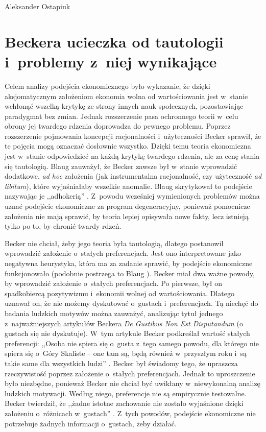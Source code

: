 \begin{artplenv}{Aleksander Ostapiuk}
\section{Beckera ucieczka od tautologii i~problemy z~niej wynikające}
Celem analizy podejścia ekonomicznego było wykazanie, że dzięki aksjomatycznym założeniom ekonomia wolna od wartościowania
jest w~stanie wchłonąć wszelką krytykę ze strony innych nauk społecznych, pozostawiając paradygmat bez zmian. Jednak
rozszerzenie pasa ochronnego teorii w~celu obrony jej twardego rdzenia doprowadza do pewnego problemu.
Poprzez rozszerzenie pojmowania koncepcji racjonalności i~użyteczności Becker sprawił, że te pojęcia mogą oznaczać
dosłownie wszystko. Dzięki temu teoria ekonomiczna jest w~stanie odpowiedzieć na każdą krytykę twardego rdzenia, ale za
cenę stania się tautologią. Blaug zauważył, że Becker zawsze był w~stanie wprowadzić dodatkowe, \textit{ad hoc}
założenia (jak instrumentalna racjonalność, czy użyteczność \textit{ad libitum}), które wyjaśniałaby wszelkie
anomalie. Blaug skrytykował to podejście nazywając je ,,adhokerią''
\parencite[s.~325–326]{blaug_metodologia_1995}.
Z~powodu wcześniej wymienionych problemów można uznać podejście ekonomiczne za program degeneracyjny, ponieważ pomocnicze
założenia nie mają sprawić, by teoria lepiej opisywała nowe fakty, lecz istnieją tylko po to, by chronić twardy rdzeń. 

Becker nie chciał, żeby jego teoria była tautologią, dlatego postanowił wprowadzić założenie o~stałych preferencjach.
Jest ono interpretowane jako negatywna heurystyka, która ma za zadanie sprawić, by podejście ekonomiczne funkcjonowało
(podobnie postrzega to Blaug \parencite*[s.~323–324]{blaug_metodologia_1995}).
Becker miał dwa ważne powody, by
wprowadzić założenie o~stałych preferencjach. Po pierwsze, był on spadkobiercą pozytywizmu i~ekonomii wolnej od
wartościowania. Dlatego uznawał on, że nie możemy dyskutować o~gustach i~preferencjach. Tą niechęć do badania ludzkich
motywów można zauważyć, analizując tytuł jednego z~najważniejszych artykułów Beckera \textit{De Gustibus Non Est
Disputandum} (o gustach się nie dyskutuje). W~tym artykule Becker podkreślał wartość stałych preferencji: ,,Osoba nie
spiera się o~gusta z~tego samego powodu, dla którego nie spiera się o~Góry Skaliste -- one tam są, będą
również w~przyszłym roku i~są takie same dla wszystkich ludzi''
\parencite[s.~76]{becker_gustibus_1977}.
Becker
był świadomy tego, że upraszcza rzeczywistość poprzez założenie o~stałych preferencjach. Jednak to uproszczenie było
niezbędne, ponieważ Becker nie chciał być uwikłany w~niewykonalną analizę ludzkich motywacji. Według niego, preferencje
nie są empirycznie testowalne. Becker twierdził, że ,,żadne istotne zachowanie nie zostało wyjaśnione dzięki
założeniu o~różnicach w~gustach''
\parencite[ s.~89]{becker_gustibus_1977}.
Z~tych powodów, podejście ekonomiczne nie
potrzebuje żadnych informacji o~gustach, żeby działać. 


\end{artplenv}
